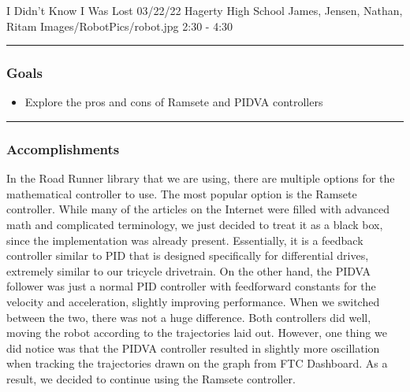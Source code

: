 \insertmeeting 
	{I Didn't Know I Was Lost} 
	{03/22/22} 
	{Hagerty High School}
	{James, Jensen, Nathan, Ritam}
	{Images/RobotPics/robot.jpg}
	{2:30 - 4:30}
	
\noindent\hfil\rule{\textwidth}{.4pt}\hfil
\subsubsection*{Goals}
\begin{itemize}
    \item Explore the pros and cons of Ramsete and PIDVA controllers

\end{itemize} 

\noindent\hfil\rule{\textwidth}{.4pt}\hfil

\subsubsection*{Accomplishments}
In the Road Runner library that we are using, there are multiple options for the mathematical controller to use. The most popular option is the Ramsete controller. While many of the articles on the Internet were filled with advanced math and complicated terminology, we just decided to treat it as a black box, since the implementation was already present. Essentially, it is a feedback controller similar to PID that is designed specifically for differential drives, extremely similar to our tricycle drivetrain. On the other hand, the PIDVA follower was just a normal PID controller with feedforward constants for the velocity and acceleration, slightly improving performance. When we switched between the two, there was not a huge difference. Both controllers did well, moving the robot according to the trajectories laid out. However, one thing we did notice was that the PIDVA controller resulted in slightly more oscillation when tracking the trajectories drawn on the graph from FTC Dashboard. As a result, we decided to continue using the Ramsete controller. 


